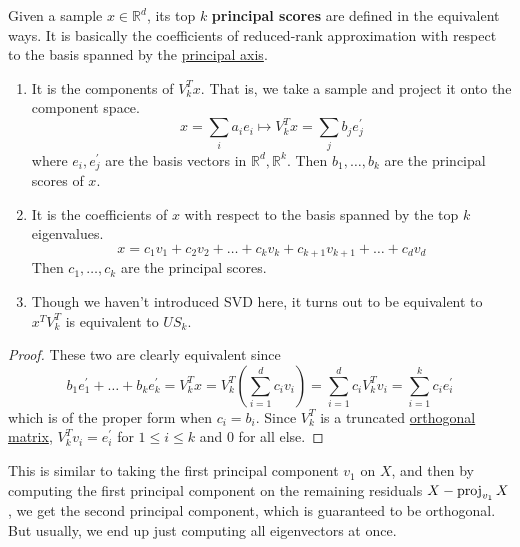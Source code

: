   \begin{definition}
    \label{def:principal-scores}
    Given a sample $x \in \mathbb{R}^d$, its top $k$ \textbf{principal scores} are defined in the equivalent ways. It is basically the coefficients of reduced-rank approximation with respect to the basis spanned by the \hyperref[def:principal-axis]{principal axis}. 
    \begin{enumerate}
      \item It is the components of $V_k^T x$. That is, we take a sample and project it onto the component space. 
      \begin{equation}
        x = \sum_i a_i e_i \mapsto V_k^T x = \sum_j b_j e_j^
        \prime
      \end{equation} 
      where $e_i, e_j^\prime$ are the basis vectors in $\mathbb{R}^d, \mathbb{R}^k$. Then $b_1, \ldots, b_k$ are the principal scores of $x$. 

      \item It is the coefficients of $x$ with respect to the basis spanned by the top $k$ eigenvalues. 
      \begin{equation}
        x = c_1 v_1 + c_2 v_2 + \ldots + c_k v_k + c_{k+1} v_{k+1} + \ldots + c_d v_d
      \end{equation} 
      Then $c_1, \ldots, c_k$ are the principal scores. 

      \item Though we haven't introduced SVD here, it turns out to be equivalent to $x^T V_k^T$ is equivalent to $US_k$. 
    \end{enumerate}
  \end{definition}
  \begin{proof}
    These two are clearly equivalent since 
    \begin{equation}
      b_1 e_1^\prime + \ldots + b_k e_k^\prime = V_k^T x = V_k^T \left( \sum_{i=1}^d c_i v_i \right) = \sum_{i=1}^d c_i V_k^T v_i = \sum_{i=1}^k c_i e_i^\prime 
    \end{equation} 
    which is of the proper form when $c_i = b_i$. Since $V_k^T$ is a truncated \hyperref[lin-def:orthogonal-matrix]{orthogonal matrix}, $V_k^T v_i = e_i^\prime$ for $1 \leq i \leq k$ and $0$ for all else. 
  \end{proof}

  This is similar to taking the first principal component $v_1$ on $X$, and then by computing the first principal component on the remaining residuals $X - \operatorname{proj}_{v_1} X$, we get the second principal component, which is guaranteed to be orthogonal. But usually, we end up just computing all eigenvectors at once. 

